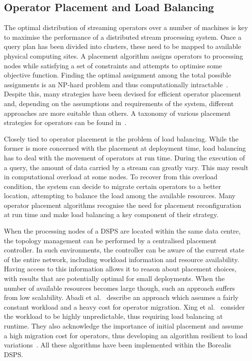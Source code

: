 \subsection*{Operator Placement and Load Balancing}
The optimal distribution of streaming operators over a number of machines is key to maximise the
performance of a distributed stream processing system. Once a query plan has been divided into
clusters, these need to be mapped to available physical computing sites. A placement algorithm
assigns operators to processing nodes while satisfying a set of constraints and attempts to optimise some
objective function. Finding the optimal assignment among the total possible assignments is an NP-hard
problem and thus computationally intractable~\cite{npc-placement}. Despite this, many strategies have
been devised for efficient operator placement and, depending on the assumptions and requirements of the
system, different approaches are more suitable than others. A taxonomy of various placement strategies
for operators can be found in~\cite{placement_strategies}.

Closely tied to operator placement is the problem of load balancing. While the former is more concerned
with the placement at deployment time, load balancing has to deal with the movement of operators at run
time. During the execution of a query, the amount of data carried by a stream can greatly vary. This may
result in computational overload at some nodes. To recover from this overload condition, the system can
decide to migrate certain operators to a better location, attempting to balance the load among the
available resources. Many operator placement algorithms recognise the need for placement reconfiguration
at run time and make load balancing a key component of their strategy.

When the processing nodes of a DSPS are located within the same data centre, the topology management can
be performed by a centralised placement controller. In such environments, the controller can be
aware of the current state of the entire network, including workload information and resource
availability. Having access to this information allows it to reason about placement choices, with results
that are potentially optimal for small deployments. When the number of available resources becomes large
though, such an approach suffers from low scalability. Abadi et al.~\cite{borealis-design} describe
an approach which assumes a fairly constant workload and a heavy cost for operator migration. Xing et
al.~\cite{borealis-xing_placement} consider the workload to be highly unpredictable, thus requiring load
balancing at runtime. They also acknowledge the importance of initial placement and assume a high
migration cost for operators, thus developing an algorithm resilient to load variations~\cite{borealis-load}.
All these algorithms have been implemented within the Borealis DSPS.

